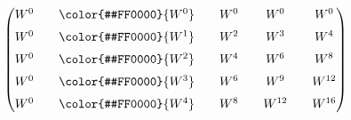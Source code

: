 $ \begin{pmatrix} W^0 \quad & \color{#FF0000}{W^0} \quad & W^0 \quad & W^0 \quad & W^0  \\[6pt] W^0 \quad & \color{#FF0000}{W^1} \quad & W^2 \quad & W^3 \quad & W^4  \\[6pt] W^0 \quad & \color{#FF0000}{W^2} \quad & W^4 \quad & W^6 \quad & W^8  \\[6pt] W^0 \quad & \color{#FF0000}{W^3} \quad & W^6 \quad & W^9 \quad & W^{12} \\[6pt] W^0 \quad & \color{#FF0000}{W^4} \quad & W^8 \quad & W^{12} \quad & W^{16} \end{pmatrix}$
